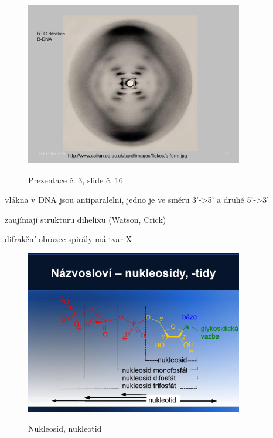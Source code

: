 \documentclass[DIV=8]{scrreprt}
\begin{document}
\begin{figure}
    \caption{Prezentace č. 3, slide č. 16}
    \includegraphics[width=0.85\textwidth]{slides-3/slide-16.jpg}
    \centering
    \label{slides-3-slide-16}
\end{figure}

\begin{myItemize}[nosep]
    \item vlákna v DNA jsou antiparalelní, jedno je ve směru 3'->5' a druhé 5'->3'
    \item zaujímají strukturu dihelixu (Watson, Crick)
\begin{myItemize}[nosep]
    \item difrakční obrazec spirály má tvar X
\end{myItemize}

\end{myItemize}



\begin{figure}
    \caption{Nukleosid, nukleotid}
    \includegraphics[width=0.85\textwidth]{slides-3/slide-21.jpg}
    \centering
    \label{}
\end{figure}
\end{document}
